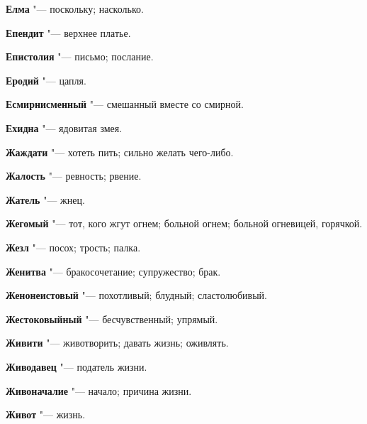 \begin{mymulticols}{2}
\noindent\textbf{Елма} "--- поскольку; насколько. 




\noindent\textbf{Епендит} "--- верхнее платье. 




\noindent\textbf{Епистолия} "--- письмо; послание. 




\noindent\textbf{Еродий} "--- цапля. 




\noindent\textbf{Есмирнисменный} "--- смешанный вместе со смирной. 




\noindent\textbf{Ехидна} "--- ядовитая змея. 









\noindent\textbf{Жаждати} "--- хотеть пить; сильно желать чего-либо. 




\noindent\textbf{Жалость} "--- ревность; рвение. 




\noindent\textbf{Жатель} "--- жнец. 




\noindent\textbf{Жегомый} "--- тот, кого жгут огнем; больной огнем; больной огневицей, горячкой. 




\noindent\textbf{Жезл} "--- посох; трость; палка. 




\noindent\textbf{Женитва} "--- бракосочетание; супружество; брак. 




\noindent\textbf{Женонеистовый} "--- похотливый; блудный; сластолюбивый. 




\noindent\textbf{Жестоковыйный} "--- бесчувственный; упрямый. 




\noindent\textbf{Живити} "--- животворить; давать жизнь; оживлять. 




\noindent\textbf{Живодавец} "--- податель жизни. 




\noindent\textbf{Живоначалие} "--- начало; причина жизни. 




\noindent\textbf{Живот} "--- жизнь. 





\end{mymulticols}
